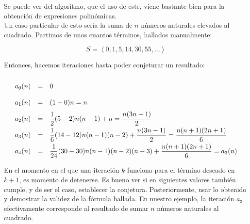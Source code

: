 Se puede ver del algoritmo, que el uso de este, viene bastante
bien para la obtención de expresiones polinómicas.\\
Un caso particular de esto sería la suma de $n$ números naturales elevados
al cuadrado. Partimos de unos cuantos términos, hallados manualmente:

\[S = \left<0, 1, 5, 14, 30, 55, \dots \right>\]

Entonces, hacemos iteraciones hasta poder conjeturar un resultado:

\[
    \RenewDocumentCommand{\arraystretch}{}{2}
    \begin{matrix*}[l]
        a_0(n) &=& 0\\
        a_1(n) &=& (1-0)n = n\\
        a_2(n) &=& \dfrac{1}{2}(5 - 2)n(n-1) + n = \dfrac{n(3n - 1)}{2}\\
        a_3(n) &=& \dfrac{1}{6}(14 - 12)n(n-1)(n-2) + \dfrac{n(3n - 1)}{2} 
        = \dfrac{n(n+1)(2n+1)}{6}\\
        a_4(n) &=& \dfrac{1}{24}(30 - 30)n(n-1)(n-2)(n-3) + \dfrac{n(n+1)(2n+1)}{6}
        = a_3(n)
    \end{matrix*}
\]

En el momento en el que una iteración $k$ funciona para el término deseado en $k+1$,
es momento de detenerse. Es bueno ver si en siguientes valores también cumple, y de ser
el caso, establecer la conjetura. Posteriormente, usar lo obtenido y demostrar la validez
de la fórmula hallada. En nuestro ejemplo, la iteración $a_3$ efectivamente corresponde
al resultado de sumar $n$ números naturales al cuadrado.
